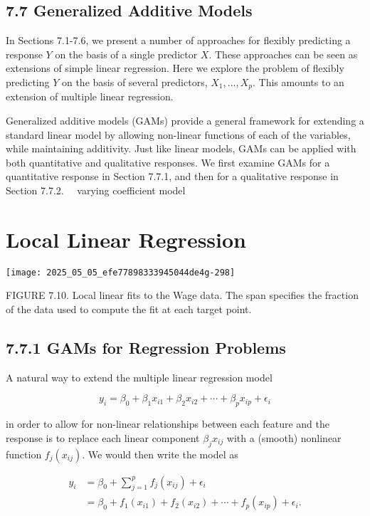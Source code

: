 \documentclass[10pt]{article}
\begin{document}
\subsection*{7.7 Generalized Additive Models}
In Sections 7.1-7.6, we present a number of approaches for flexibly predicting a response $Y$ on the basis of a single predictor $X$. These approaches can be seen as extensions of simple linear regression. Here we explore the problem of flexibly predicting $Y$ on the basis of several predictors, $X_{1}, \ldots, X_{p}$. This amounts to an extension of multiple linear regression.

Generalized additive models (GAMs) provide a general framework for extending a standard linear model by allowing non-linear functions of each of the variables, while maintaining additivity. Just like linear models, GAMs can be applied with both quantitative and qualitative responses. We first examine GAMs for a quantitative response in Section 7.7.1, and then for a qualitative response in Section 7.7.2.\
\
varying coefficient model

\section*{Local Linear Regression}
\begin{center}
\texttt{[image: 2025\_05\_05\_efe77898333945044de4g-298]}
\end{center}

FIGURE 7.10. Local linear fits to the Wage data. The span specifies the fraction of the data used to compute the fit at each target point.

\subsection*{7.7.1 GAMs for Regression Problems}
A natural way to extend the multiple linear regression model

$$
y_{i}=\beta_{0}+\beta_{1} x_{i 1}+\beta_{2} x_{i 2}+\cdots+\beta_{p} x_{i p}+\epsilon_{i}
$$

in order to allow for non-linear relationships between each feature and the response is to replace each linear component $\beta_{j} x_{i j}$ with a (smooth) nonlinear function $f_{j}\left(x_{i j}\right)$. We would then write the model as


\begin{align*}
y_{i} & =\beta_{0}+\sum_{j=1}^{p} f_{j}\left(x_{i j}\right)+\epsilon_{i} \\
& =\beta_{0}+f_{1}\left(x_{i 1}\right)+f_{2}\left(x_{i 2}\right)+\cdots+f_{p}\left(x_{i p}\right)+\epsilon_{i} . \tag{7.15}
\end{align*}
\end{document}
